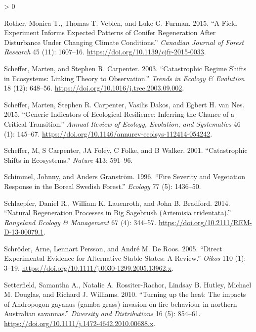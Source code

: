 \documentclass[
  12pt,
]{article}
\newlength{\cslhangindent}
\newenvironment{CSLReferences}[2] %
 {%
  \setlength{\parindent}{0pt}
  \ifodd #1 \everypar{\setlength{\hangindent}{\cslhangindent}}\ignorespaces\fi
  \ifnum #2 > 0
  \setlength{\parskip}{#2\baselineskip}
  \fi
 }%
 {}
\begin{document}
\begin{CSLReferences}{1}{0}
\leavevmode\hypertarget{ref-Rother2015}{}%
Rother, Monica T., Thomas T. Veblen, and Luke G. Furman. 2015. {``A
Field Experiment Informs Expected Patterns of Conifer Regeneration After
Disturbance Under Changing Climate Conditions.''} \emph{Canadian Journal
of Forest Research} 45 (11): 1607--16.
\url{https://doi.org/10.1139/cjfr-2015-0033}.

\leavevmode\hypertarget{ref-Scheffer2003}{}%
Scheffer, Marten, and Stephen R. Carpenter. 2003. {``Catastrophic Regime
Shifts in Ecosystems: Linking Theory to Observation.''} \emph{Trends in
Ecology \& Evolution} 18 (12): 648--56.
\url{https://doi.org/10.1016/j.tree.2003.09.002}.

\leavevmode\hypertarget{ref-Scheffer2015}{}%
Scheffer, Marten, Stephen R. Carpenter, Vasilis Dakos, and Egbert H. van
Nes. 2015. {``Generic {Indicators} of {Ecological} {Resilience}:
{Inferring} the {Chance} of a {Critical} {Transition}.''} \emph{Annual
Review of Ecology, Evolution, and Systematics} 46 (1): 145--67.
\url{https://doi.org/10.1146/annurev-ecolsys-112414-054242}.

\leavevmode\hypertarget{ref-Scheffer2001}{}%
Scheffer, M, S Carpenter, JA Foley, C Folke, and B Walker. 2001.
{``Catastrophic Shifts in Ecosystems.''} \emph{Nature} 413: 591--96.

\leavevmode\hypertarget{ref-Schimmel1996}{}%
Schimmel, Johnny, and Anders Granström. 1996. {``{Fire Severity and
Vegetation Response in the Boreal Swedish Forest}.''} \emph{Ecology} 77
(5): 1436--50.

\leavevmode\hypertarget{ref-Schlaepfer2014}{}%
Schlaepfer, Daniel R., William K. Lauenroth, and John B. Bradford. 2014.
{``{Natural Regeneration Processes in Big Sagebrush (Artemisia
tridentata)}.''} \emph{Rangeland Ecology \& Management} 67 (4): 344--57.
\url{https://doi.org/10.2111/REM-D-13-00079.1}.

\leavevmode\hypertarget{ref-Schroder2005}{}%
Schröder, Arne, Lennart Persson, and André M. De Roos. 2005. {``Direct
Experimental Evidence for Alternative Stable States: {A} Review.''}
\emph{Oikos} 110 (1): 3--19.
\url{https://doi.org/10.1111/j.0030-1299.2005.13962.x}.

\leavevmode\hypertarget{ref-Setterfield2010}{}%
Setterfield, Samantha A., Natalie A. Rossiter-Rachor, Lindsay B. Hutley,
Michael M. Douglas, and Richard J. Williams. 2010. {``{Turning up the
heat: The impacts of Andropogon gayanus (gamba grass) invasion on fire
behaviour in northern Australian savannas}.''} \emph{Diversity and
Distributions} 16 (5): 854--61.
\url{https://doi.org/10.1111/j.1472-4642.2010.00688.x}.


\end{CSLReferences}
\end{document}
